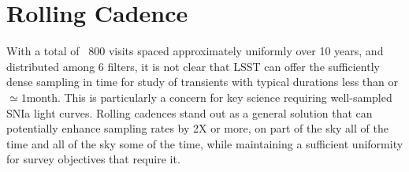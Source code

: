 

%

%
%
%
%
%
%

\section{ Rolling Cadence }
\label{sec:rolling}



With a total of ~800 visits spaced approximately uniformly over 10 years, and distributed among 6 filters,
it is not clear that LSST can offer the sufficiently dense sampling in time for study of transients with typical durations less than or $\simeq 1$month.
This is particularly a concern for key science requiring well-sampled SNIa light curves.  Rolling cadences stand out as a
general solution that can potentially enhance sampling rates by 2X or more, on part of the sky all of the time and all of the sky some of the time,
while maintaining a sufficient uniformity for survey objectives that require it.

